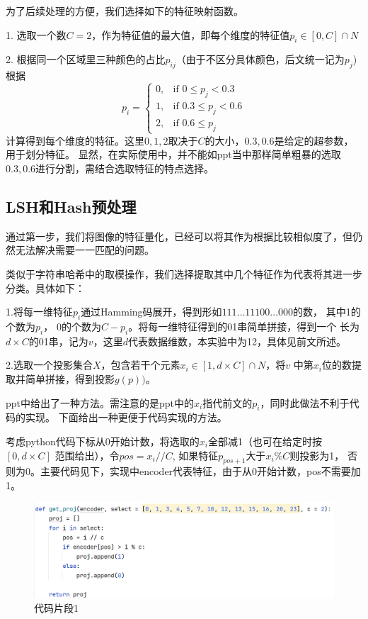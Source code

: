 \documentclass{article}
\begin{document}
    为了后续处理的方便，我们选择如下的特征映射函数。

    1. 选取一个数\(C = 2\)，作为特征值的最大值，即每个维度的特征值\(p_i \in [0, C] \cap N\)

    2. 根据同一个区域里三种颜色的占比\(p_{ij}\)（由于不区分具体颜色，后文统一记为\(p_j\))
    根据\[
p_i =
\begin{cases}
0, & \text{if } 0 \leq p_j < 0.3 \\
1, & \text{if } 0.3 \leq p_j < 0.6 \\
2, & \text{if } 0.6 \leq p_j
\end{cases}
\]
    计算得到每个维度的特征。这里\(0,1,2\)取决于\(C\)的大小，\(0.3, 0.6\)是给定的超参数，用于划分特征。
    显然，在实际使用中，并不能如ppt当中那样简单粗暴的选取\(0.3, 0.6\)进行分割，需结合选取特征的特点选择。

\subsection{LSH和Hash预处理}

    通过第一步，我们将图像的特征量化，已经可以将其作为根据比较相似度了，但仍然无法解决需要一一匹配的问题。

    类似于字符串哈希中的取模操作，我们选择提取其中几个特征作为代表将其进一步分类。具体如下：

    1.将每一维特征\(p_i\)通过Hamming码展开，得到形如\(111\ldots11100\ldots000\)的数，
    其中1的个数为\(p_i\)， 0的个数为\(C - p_i\)。将每一维特征得到的01串简单拼接，得到一个
    长为\(d \times C\)的01串，记为\(v\)，这里\(d\)代表数据维数，本实验中为12，具体见前文所述。

    2.选取一个投影集合\(X\)，包含若干个元素\(x_i \in [1, d \times C] \cap N\)，将\(v\)
    中第\(x_i\)位的数提取并简单拼接，得到投影\(g(p))\)。

    ppt中给出了一种方法。需注意的是ppt中的\(x_i\)指代前文的\(p_i\)，同时此做法不利于代码的实现。
    下面给出一种更便于代码实现的方法。

    考虑python代码下标从0开始计数，将选取的\(x_i\)全部减1（也可在给定时按\([0, d \times C]\)
    范围给出），令\(pos = x_i // C\), 如果特征\(p_{pos + 1}\)大于\(x_i \% C\)则投影为1，
    否则为0。主要代码见下，实现中encoder代表特征，由于从0开始计数，pos不需要加1。

\begin{figure}[h]
\centering
\includegraphics[width=1\textwidth]{./prog_part/1}
\caption{代码片段1}
\end{figure}
\end{document}

